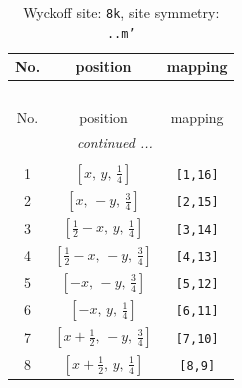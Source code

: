 \documentclass[fleqn,8pt]{jsarticle}
\begin{document}
\begin{longtable}{ccc}
\caption{Wyckoff site: {\tt 8k}, site symmetry: {\tt ..m'}}
 \\
 \hline \hline
No. & position & mapping \\ \hline \endfirsthead

\multicolumn{2}{l}{\tablename\ \thetable{}} \\
 \hline \hline
No. & position & mapping \\ \hline \endhead

 \hline \hline
\multicolumn{2}{r}{\footnotesize\it continued ...} \\ \endfoot

 \hline \hline
\multicolumn{2}{r}{} \\ \endlastfoot

1 & $\left[ x,\, y,\, \frac{1}{4} \right]$ & {\tt [1,16]} \\ \hline
2 & $\left[ x,\, - y,\, \frac{3}{4} \right]$ & {\tt [2,15]} \\ \hline
3 & $\left[ \frac{1}{2} - x,\, y,\, \frac{1}{4} \right]$ & {\tt [3,14]} \\ \hline
4 & $\left[ \frac{1}{2} - x,\, - y,\, \frac{3}{4} \right]$ & {\tt [4,13]} \\ \hline
5 & $\left[ - x,\, - y,\, \frac{3}{4} \right]$ & {\tt [5,12]} \\ \hline
6 & $\left[ - x,\, y,\, \frac{1}{4} \right]$ & {\tt [6,11]} \\ \hline
7 & $\left[ x + \frac{1}{2},\, - y,\, \frac{3}{4} \right]$ & {\tt [7,10]} \\ \hline
8 & $\left[ x + \frac{1}{2},\, y,\, \frac{1}{4} \right]$ & {\tt [8,9]} \\
\end{longtable}
\renewcommand{\arraystretch}{1.2}
\end{document}
